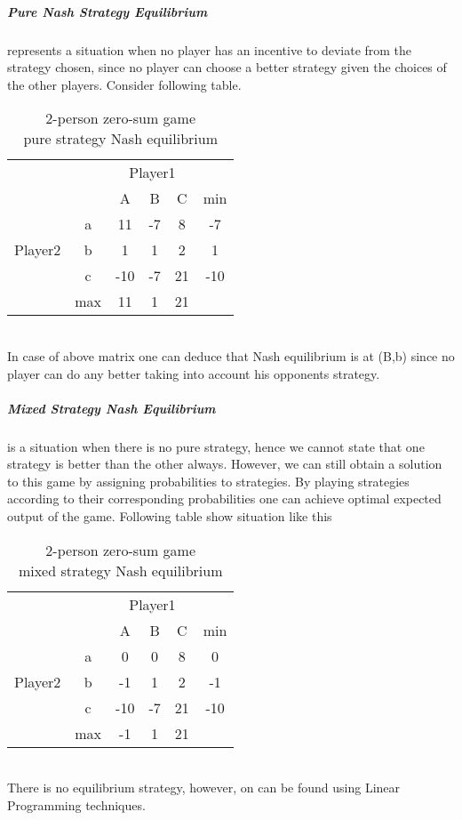 \documentclass[10pt, a4paper]{report}
\begin{document}
\subparagraph{Pure Nash Strategy Equilibrium} represents a situation when no player has an incentive to deviate from the strategy chosen, since no player can choose a better strategy given the choices of the other players. Consider following table.
\begin{table}[ht!]
	\hspace{-4em}
	\centering
	\begin{tabular}{ccccc|c}
		& & \multicolumn{3}{c}{Player1} &                                     \\ \cline{3-5}
		& & A & B & \multicolumn{1}{c}{C} & min                               \\ \cline{3-5}
		\multirow{3}{*}{Player2} & \multicolumn{1}{|c|}{a} & 11 & -7 & 8 & -7 \\
		& \multicolumn{1}{|c|}{b} & 1 & 1 & 2 & 1                             \\
		& \multicolumn{1}{|c|}{c} & -10 & -7 & 21 & -10                       \\ \cline{3-5}
		& max & 11 & 1 & \multicolumn{1}{c}{21} &
	\end{tabular}
	\caption{2-person zero-sum game\\ pure strategy Nash equilibrium}
\end{table}
\\
In case of above matrix one can deduce that Nash equilibrium is at (B,b) since no player can do any better taking into account his opponents strategy.

\subparagraph{Mixed Strategy Nash Equilibrium} is a situation when there is no pure strategy, hence we cannot state that one strategy is better than the other always. However, we can still obtain a solution to this game by assigning probabilities to strategies. By playing strategies according to their corresponding probabilities one can achieve optimal expected output of the game. Following table show situation like this
\begin{table}[ht!]
	\hspace{-2em}
	\centering
	\begin{tabular}{ccccc|c}
		& & \multicolumn{3}{c}{Player1} &                                  \\ \cline{3-5}
		& & A & B & \multicolumn{1}{c}{C} & min                            \\ \cline{3-5}
		\multirow{3}{*}{Player2} & \multicolumn{1}{|c|}{a} & 0 & 0 & 8 & 0 \\
		& \multicolumn{1}{|c|}{b} & -1 & 1 & 2 & -1                        \\
		& \multicolumn{1}{|c|}{c} & -10 & -7 & 21 & -10                    \\ \cline{3-5}
		& max & -1 & 1 & \multicolumn{1}{c}{21} &
	\end{tabular}
	\caption{2-person zero-sum game\\mixed strategy Nash equilibrium}
\end{table}
\\
There is no equilibrium strategy, however, on can be found using Linear Programming techniques.
\end{document}
